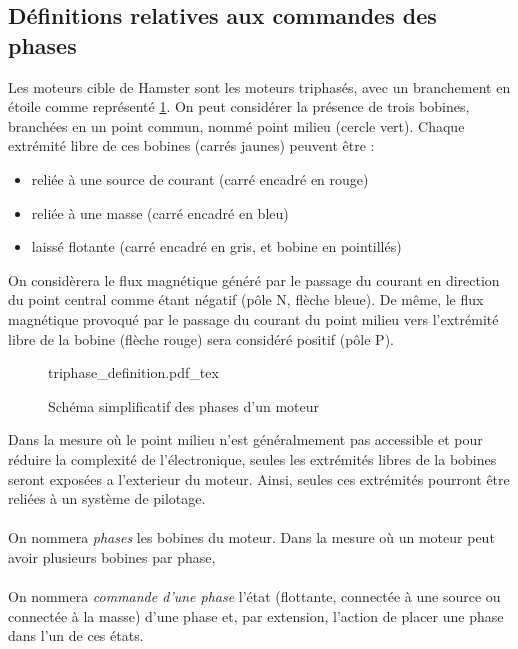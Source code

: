 \subsection{Définitions relatives aux commandes des phases}

Les moteurs cible de Hamster sont les moteurs triphasés, avec un branchement en étoile comme représenté \cref{fig:schema_phases_moteur}.
On peut considérer la présence de trois bobines, branchées en un point commun, nommé point milieu (cercle vert).
Chaque extrémité libre de ces bobines (carrés jaunes) peuvent être :
\begin{itemize}
    \item reliée à une source de courant (carré encadré en rouge)
    \item reliée à une masse (carré encadré en bleu)
    \item laissé flotante (carré encadré en gris, et bobine en pointillés)
\end{itemize}

On considèrera le flux magnétique généré par le passage du courant en direction du point central comme étant négatif (pôle N, flèche bleue).
De même, le flux magnétique provoqué par le passage du courant du point milieu vers l'extrémité libre de la bobine (flèche rouge) sera considéré positif (pôle P).

\begin{figure}[h]
    \centering
    {triphase_definition.pdf_tex}
    \caption{Schéma simplificatif des phases d'un moteur}
    \label{fig:schema_phases_moteur}
\end{figure}

Dans la mesure où le point milieu n'est généralmement pas accessible et pour réduire la complexité de l'électronique, seules les extrémités libres de la bobines seront exposées a l'exterieur du moteur.
Ainsi, seules ces extrémités pourront être reliées à un système de pilotage.

\paragraph{}
On nommera \emph{phases} les bobines du moteur. Dans la mesure où un moteur peut avoir plusieurs bobines par phase, 

\paragraph{}
On nommera \emph{commande d'une phase} l'état (flottante, connectée  à une source ou connectée à la masse) d'une phase et, par extension, l'action de placer une phase dans l'un de ces états.

